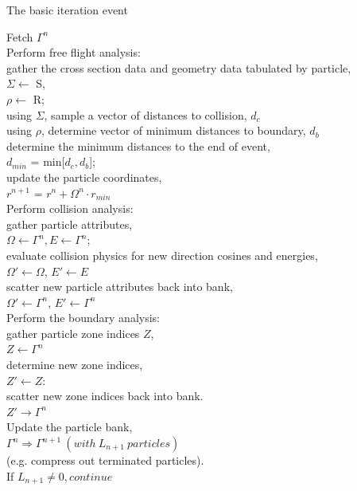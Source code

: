 %
\begin{algorithm}
\DontPrintSemicolon
\caption{The basic iteration event}
\label{alg:basicEvent}
{
	 Fetch $\Gamma^{n}$ \\
	 Perform free flight analysis:\\
	\Indp	 gather the cross section data and geometry data tabulated by particle,\\
		 $\Sigma \leftarrow$ S,\\
		 $\rho \leftarrow$ R;\\
		 using $\Sigma$, sample a vector of distances to collision, $d_{c}$\\
		 using $\rho$, determine vector of minimum distances to boundary, $d_{b}$\\
		 determine the minimum distances to the end of event,\\
		\Indp $d_{min}$ = min[$d_{c}, d_{b}$];\\
		\Indm  update the particle coordinates,\\
		\Indp $r^{n+1}$ = $r^{n} + \Omega^{n} \cdot r_{min}$\\
	\Indm  Perform collision analysis:\\
	\Indp  gather particle attributes,\\
	\Indp $\Omega \leftarrow \Gamma^{n}, E \leftarrow \Gamma^{n}$;\\
	\Indm  evaluate collision physics for new direction cosines and energies,\\
	\Indp $\Omega ' \leftarrow \Omega$, $E' \leftarrow  E$\\
	\Indm  scatter new particle attributes back into bank,\\
	\Indp $\Omega ' \leftarrow \Gamma^{n}$, $E' \leftarrow  \Gamma^{n}$\\
	\Indm \Indm  Perform the boundary analysis:\\
	\Indp  gather particle zone indices $Z$,\\
	\Indp $Z \leftarrow \Gamma^{n}$\\
	\Indm  determine new zone indices,\\
	\Indp $Z' \leftarrow Z:$\\
	\Indm  scatter new zone indices back into bank.\\
	\Indp $Z' \rightarrow \Gamma^{n}$\\
	\Indm \Indm  Update the particle bank,\\
	\Indp $\Gamma^{n} \Rightarrow \Gamma^{n+1}\ (with\ L_{n+1}\ particles )$ \\
	(e.g. compress out terminated particles).\\
	\Indm  If $L_{n+1} \neq 0, continue$\\
}
\end{algorithm}
%


